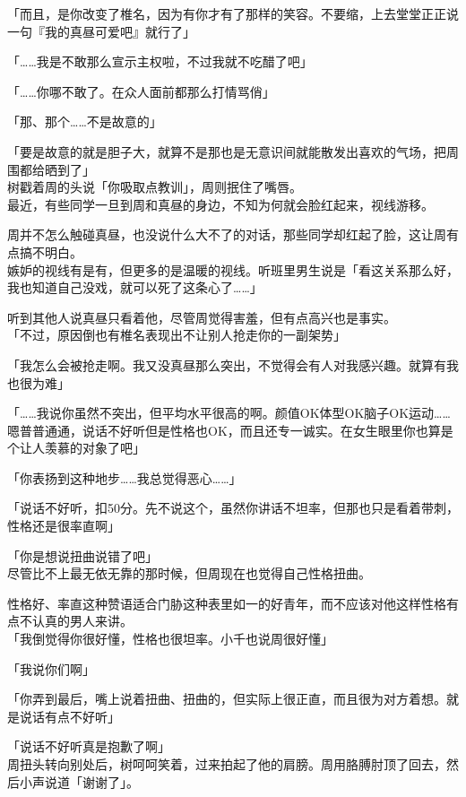 「而且，是你改变了椎名，因为有你才有了那样的笑容。不要缩，上去堂堂正正说一句『我的真昼可爱吧』就行了」

「……我是不敢那么宣示主权啦，不过我就不吃醋了吧」

「……你哪不敢了。在众人面前都那么打情骂俏」

「那、那个……不是故意的」

「要是故意的就是胆子大，就算不是那也是无意识间就能散发出喜欢的气场，把周围都给晒到了」\\

树戳着周的头说「你吸取点教训」，周则抿住了嘴唇。\\

最近，有些同学一旦到周和真昼的身边，不知为何就会脸红起来，视线游移。

周并不怎么触碰真昼，也没说什么大不了的对话，那些同学却红起了脸，这让周有点搞不明白。\\

嫉妒的视线有是有，但更多的是温暖的视线。听班里男生说是「看这关系那么好，我也知道自己没戏，就可以死了这条心了……」

听到其他人说真昼只看着他，尽管周觉得害羞，但有点高兴也是事实。\\

「不过，原因倒也有椎名表现出不让别人抢走你的一副架势」

「我怎么会被抢走啊。我又没真昼那么突出，不觉得会有人对我感兴趣。就算有我也很为难」

「……我说你虽然不突出，但平均水平很高的啊。颜值OK体型OK脑子OK运动……嗯普普通通，说话不好听但是性格也OK，而且还专一诚实。在女生眼里你也算是个让人羡慕的对象了吧」

「你表扬到这种地步……我总觉得恶心……」

「说话不好听，扣50分。先不说这个，虽然你讲话不坦率，但那也只是看着带刺，性格还是很率直啊」

「你是想说扭曲说错了吧」\\

尽管比不上最无依无靠的那时候，但周现在也觉得自己性格扭曲。

性格好、率直这种赞语适合门胁这种表里如一的好青年，而不应该对他这样性格有点不认真的男人来讲。\\

「我倒觉得你很好懂，性格也很坦率。小千也说周很好懂」

「我说你们啊」

「你弄到最后，嘴上说着扭曲、扭曲的，但实际上很正直，而且很为对方着想。就是说话有点不好听」

「说话不好听真是抱歉了啊」\\

周扭头转向别处后，树呵呵笑着，过来拍起了他的肩膀。周用胳膊肘顶了回去，然后小声说道「谢谢了」。
